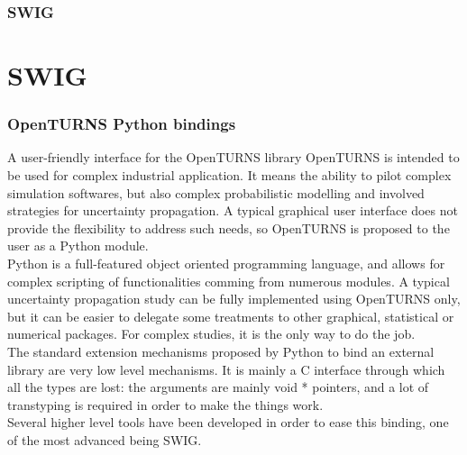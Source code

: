 \documentclass[8pt]{beamer}
\begin{document}
\begin{frame}
  \frametitle{SWIG}
  \tableofcontents[part=1]
\end{frame}
\section[SWIG]{SWIG}
\begin{frame}
  \frametitle{OpenTURNS Python bindings}
  \begin{block}{A user-friendly interface for the OpenTURNS library}
    OpenTURNS is intended to be used for complex industrial application. It means the ability to pilot complex simulation softwares, but also complex probabilistic modelling and involved strategies for uncertainty propagation. A typical graphical user interface does not provide the flexibility to address such needs, so OpenTURNS is proposed to the user as a Python module.\\
    Python is a full-featured object oriented programming language, and allows for complex scripting of functionalities comming from numerous modules. A typical uncertainty propagation study can be fully implemented using OpenTURNS only, but it can be easier to delegate some treatments to other graphical, statistical or numerical packages. For complex studies, it is the only way to do the job.\\
    The standard extension mechanisms proposed by Python to bind an external library are very low level mechanisms. It is mainly a C interface through which all the types are lost: the arguments are mainly {\ttfamily void *} pointers, and a lot of transtyping is required in order to make the things work.\\
    Several higher level tools have been developed in order to ease this binding, one of the most advanced being SWIG.
  \end{block}
\end{frame}
\end{document}
